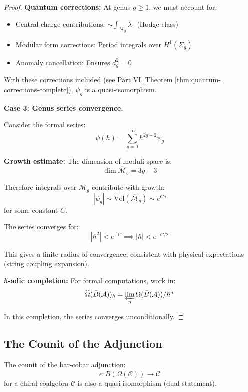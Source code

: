 \begin{proof}
\textbf{Quantum corrections:} At genus $g \geq 1$, we must account for:
\begin{itemize}
\item Central charge contributions: $\sim \int_{\overline{\mathcal{M}}_g} \lambda_1$ 
      (Hodge class)
\item Modular form corrections: Period integrals over $H^1(\Sigma_g)$
\item Anomaly cancellation: Ensures $d_g^2 = 0$
\end{itemize}

With these corrections included (see Part VI, Theorem \ref{thm:quantum-corrections-complete}), 
$\psi_g$ is a quasi-isomorphism.

\textbf{Case 3: Genus series convergence.}

Consider the formal series:
$$\psi(\hbar) = \sum_{g=0}^\infty \hbar^{2g-2} \psi_g$$

\textbf{Growth estimate:} The dimension of moduli space is:
$$\dim \overline{\mathcal{M}}_g = 3g - 3$$

Therefore integrals over $\overline{\mathcal{M}}_g$ contribute with growth:
$$|\psi_g| \sim \text{Vol}(\overline{\mathcal{M}}_g) \sim e^{Cg}$$
for some constant $C$.

The series converges for:
$$|\hbar^2| < e^{-C} \implies |\hbar| < e^{-C/2}$$

This gives a finite radius of convergence, consistent with physical expectations 
(string coupling expansion).

\textbf{$\hbar$-adic completion:} For formal computations, work in:
$$\widehat{\Omega}(\bar{B}(\mathcal{A}))_\hbar = \varprojlim_n 
\Omega(\bar{B}(\mathcal{A})) / \hbar^n$$

In this completion, the series converges unconditionally.
\end{proof}

\subsection{The Counit of the Adjunction}

\begin{proposition}\label{prop:counit-qi}
The counit of the bar-cobar adjunction:
$$\epsilon: \bar{B}(\Omega(\mathcal{C})) \longrightarrow \mathcal{C}$$
for a chiral coalgebra $\mathcal{C}$ is also a quasi-isomorphism (dual statement).
\end{proposition}

